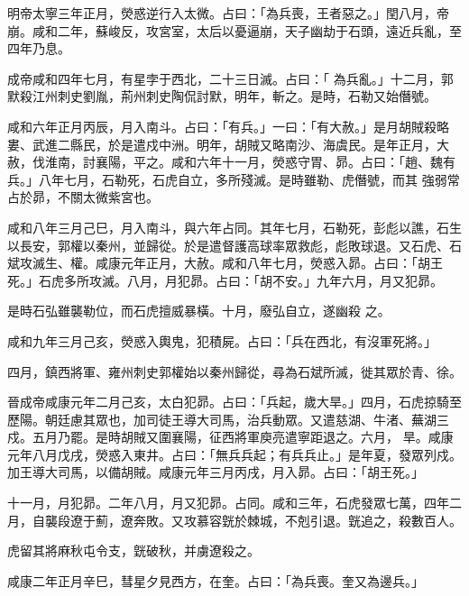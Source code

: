\begin{pinyinscope}
 明帝太寧三年正月，熒惑逆行入太微。占曰：「為兵喪，王者惡之。」閏八月，帝崩。咸和二年，蘇峻反，攻宮室，太后以憂逼崩，天子幽劫于石頭，遠近兵亂，至四年乃息。



 成帝咸和四年七月，有星孛于西北，二十三日滅。占曰：「
 為兵亂。」十二月，郭默殺江州刺史劉胤，荊州刺史陶侃討默，明年，斬之。是時，石勒又始僭號。



 咸和六年正月丙辰，月入南斗。占曰：「有兵。」一曰：「有大赦。」是月胡賊殺略婁、武進二縣民，於是遣戍中洲。明年，胡賊又略南沙、海虞民。是年正月，大赦，伐淮南，討襄陽，平之。咸和六年十一月，熒惑守胃、昴。占曰：「趙、魏有兵。」八年七月，石勒死，石虎自立，多所殘滅。是時雖勒、虎僭號，而其
 強弱常占於昴，不關太微紫宮也。



 咸和八年三月己巳，月入南斗，與六年占同。其年七月，石勒死，彭彪以譙，石生以長安，郭權以秦州，並歸從。於是遣督護高球率眾救彪，彪敗球退。又石虎、石斌攻滅生、權。咸康元年正月，大赦。咸和八年七月，熒惑入昴。占曰：「胡王死。」石虎多所攻滅。八月，月犯昴。占曰：「胡不安。」九年六月，月又犯昴。



 是時石弘雖襲勒位，而石虎擅威暴橫。十月，廢弘自立，遂幽殺
 之。



 咸和九年三月己亥，熒惑入輿鬼，犯積屍。占曰：「兵在西北，有沒軍死將。」



 四月，鎮西將軍、雍州刺史郭權始以秦州歸從，尋為石斌所滅，徙其眾於青、徐。



 晉成帝咸康元年二月己亥，太白犯昴。占曰：「兵起，歲大旱。」四月，石虎掠騎至歷陽。朝廷慮其眾也，加司徒王導大司馬，治兵動眾。又遣慈湖、牛渚、蕪湖三戍。五月乃罷。是時胡賊又圍襄陽，征西將軍庾亮遣寧距退之。六月，
 旱。咸康元年八月戊戌，熒惑入東井。占曰：「無兵兵起；有兵兵止。」是年夏，發眾列戍。加王導大司馬，以備胡賊。咸康元年三月丙戌，月入昴。占曰：「胡王死。」



 十一月，月犯昴。二年八月，月又犯昴。占同。咸和三年，石虎發眾七萬，四年二月，自襲段遼于薊，遼奔敗。又攻慕容皝於棘城，不剋引退。皝追之，殺數百人。



 虎留其將麻秋屯令支，皝破秋，并虜遼殺之。



 咸康二年正月辛巳，彗星夕見西方，在奎。占曰：「為兵喪。奎又為邊兵。」




\end{pinyinscope}
